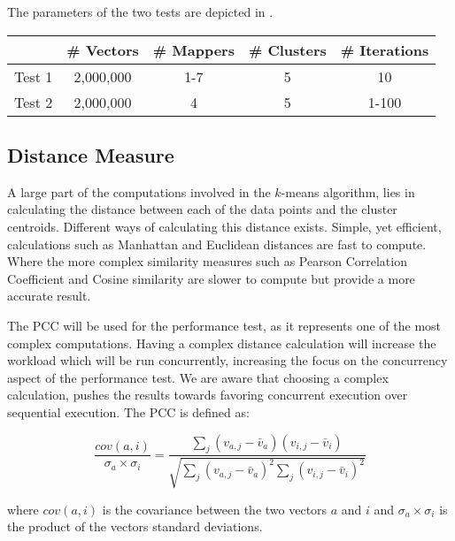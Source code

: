 The parameters of the two tests are depicted in .

\begin{center}
\begin{table}[h]
\centering
\begin{tabular}{c|cccc}
       & \# Vectors        & \# Mappers			 	& \# Clusters & \# Iterations \\ \hline
Test 1 & 2,000,000         & 1-7        			& 5           & 10            \\
Test 2 & 2,000,000		   & 4          			& 5           & 1-100           
\end{tabular}
\end{table}
 \label{tab:test_description} 
\end{center}

\subsection{Distance Measure}
A large part of the computations involved in the $k$-means algorithm, lies in calculating the distance between each of the data points and the cluster centroids. Different ways of calculating this distance exists. Simple, yet efficient, calculations such as Manhattan and Euclidean\cite[p. 41]{amatriain2011data} distances are fast to compute. Where the more complex similarity measures such as Pearson Correlation Coefficient and Cosine similarity\cite[p. 42]{amatriain2011data}\cite{breese1998empirical} are slower to compute but provide a more accurate result.

The \ac{PCC} will be used for the performance test, as it represents one of the most complex computations. Having a complex distance calculation will increase the workload which will be run concurrently, increasing the focus on the concurrency aspect of the performance test. We are aware that choosing a complex calculation, pushes the results towards favoring concurrent execution over sequential execution. The \ac{PCC} is 
defined as:

\begin{equation}\label{pearsonverbose}
\frac{cov(a,i)}{\sigma_a \times \sigma_i} = \frac{\sum_j(v_{a,j}-\bar{v}_a)(v_{i,j}-\bar{v}_i)}{\sqrt{{\sum_j}(v_{a,j}-\bar{v}_a)^2 \sum_j(v_{i,j}-\bar{v}_i)^2}}
\end{equation}

where $cov(a,i)$ is the covariance between the two vectors $a$ and $i$ and $\sigma_a \times \sigma_i$ is the product of the vectors standard deviations. 
%
